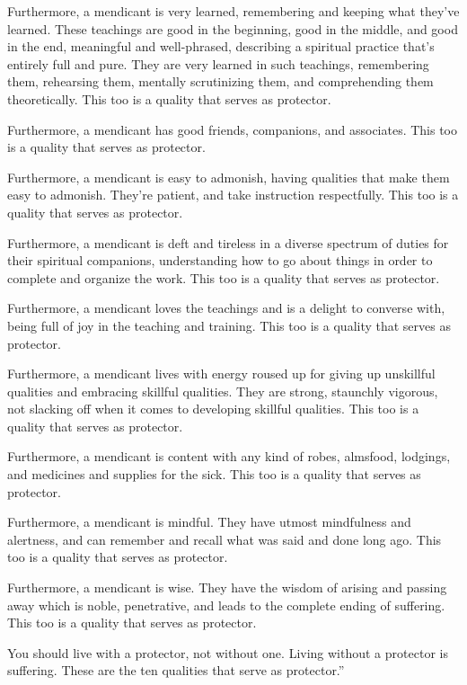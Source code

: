 \documentclass[12pt,openany]{book}%
\begin{document}
Furthermore, a mendicant is very learned, remembering and keeping what they’ve learned. These teachings are good in the beginning, good in the middle, and good in the end, meaningful and well-phrased, describing a spiritual practice that’s entirely full and pure. They are very learned in such teachings, remembering them, rehearsing them, mentally scrutinizing them, and comprehending them theoretically. This too is a quality that serves as protector. 

Furthermore, a mendicant has good friends, companions, and associates. This too is a quality that serves as protector. 

Furthermore, a mendicant is easy to admonish, having qualities that make them easy to admonish. They’re patient, and take instruction respectfully. This too is a quality that serves as protector. 

Furthermore, a mendicant is deft and tireless in a diverse spectrum of duties for their spiritual companions, understanding how to go about things in order to complete and organize the work. This too is a quality that serves as protector. 

Furthermore, a mendicant loves the teachings and is a delight to converse with, being full of joy in the teaching and training. This too is a quality that serves as protector. 

Furthermore, a mendicant lives with energy roused up for giving up unskillful qualities and embracing skillful qualities. They are strong, staunchly vigorous, not slacking off when it comes to developing skillful qualities. This too is a quality that serves as protector. 

Furthermore, a mendicant is content with any kind of robes, almsfood, lodgings, and medicines and supplies for the sick. This too is a quality that serves as protector. 

Furthermore, a mendicant is mindful. They have utmost mindfulness and alertness, and can remember and recall what was said and done long ago. This too is a quality that serves as protector. 

Furthermore, a mendicant is wise. They have the wisdom of arising and passing away which is noble, penetrative, and leads to the complete ending of suffering. This too is a quality that serves as protector. 

You should live with a protector, not without one. Living without a protector is suffering. These are the ten qualities that serve as protector.” 
\end{document}
